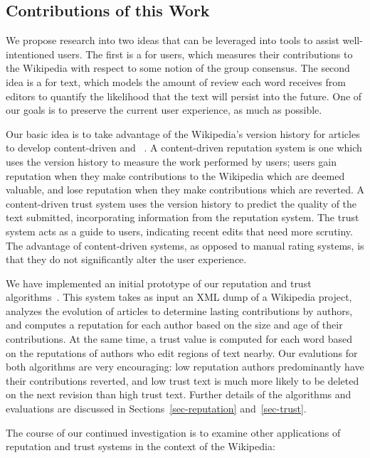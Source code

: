 \subsection{Contributions of this Work}

We propose research into two ideas that can be leveraged
into tools to assist well-intentioned users.
The first is a  for users, which measures
their contributions to the Wikipedia with respect to some
notion of the group consensus.
The second idea is a  for text,
which models the amount of review each word receives from editors
to quantify the likelihood that the text will persist
into the future.
One of our goals is to preserve the current user experience,
as much as possible.


Our basic idea is to take advantage of the Wikipedia's version history
for articles to develop content-driven 
and ~\cite{WikiMTWtrust06,McGuinness06,www07,WikiTrust2008}.
A content-driven reputation system is one which uses
the version history to measure the work performed by users;
users gain reputation when they make
contributions to the Wikipedia which are deemed valuable, and lose reputation
when they make contributions which are reverted.
A content-driven trust system uses the version history
to predict the quality of the text submitted, incorporating
information from the reputation system.
The trust system acts as a guide to users,
indicating recent edits that need more scrutiny.
The advantage of content-driven systems,
as opposed to manual rating systems, is that they do
not significantly alter the user experience.

We have implemented an initial prototype of our reputation and
trust algorithms~\cite{www07,WikiTrust2008}.
This system takes as input an XML dump of a Wikipedia project,
analyzes the evolution of articles to determine lasting
contributions by authors, and computes a reputation for
each author based on the size and age of their contributions.
At the same time, a trust value is computed for each word
based on the reputations of authors who edit
regions of text nearby.
Our evalutions for both algorithms are very encouraging:
low reputation authors predominantly have their contributions
reverted, and low trust text is much more likely to be
deleted on the next revision than high trust text.
Further details of the algorithms and evaluations
are discussed in Sections~\ref{sec-reputation}
and~\ref{sec-trust}.

The course of our continued investigation is to examine
other applications of reputation and trust systems in
the context of the Wikipedia:


